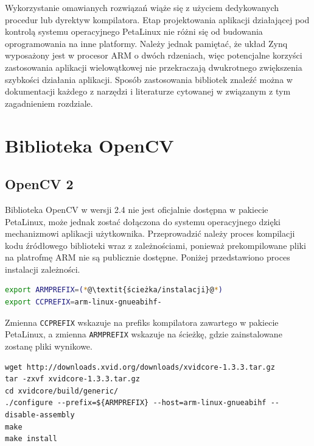 Wykorzystanie omawianych rozwiązań wiąże się z użyciem dedykowanych procedur lub dyrektyw kompilatora. 
Etap projektowania aplikacji działającej pod kontrolą systemu operacyjnego PetaLinux nie różni się od budowania oprogramowania na inne platformy. Należy jednak pamiętać, że układ Zynq wyposażony jest w procesor ARM o dwóch rdzeniach, więc potencjalne korzyści zastosowania aplikacji wielowątkowej nie przekraczają dwukrotnego zwiększenia szybkości działania aplikacji.
Sposób zastosowania bibliotek znaleźć można w dokumentacji każdego z narzędzi i literaturze cytowanej w związanym z tym zagadnieniem rozdziale.

\section{Biblioteka OpenCV}
\label{sec:opencv-config}
\subsection{OpenCV 2}
Biblioteka OpenCV w wersji 2.4 nie jest oficjalnie dostępna w pakiecie PetaLinux, może jednak zostać dołączona do systemu operacyjnego dzięki mechanizmowi aplikacji użytkownika.
Przeprowadzić należy proces kompilacji kodu źródłowego biblioteki wraz z zależnościami, ponieważ prekompilowane pliki na platrofmę ARM nie są publicznie dostępne. Poniżej przedstawiono proces instalacji zależności.%

\begin{lstlisting}[breaklines=true, language=Bash, caption=Definicja zmiennych środowiskowych.]
export ARMPREFIX=(*@\textit{ścieżka/instalacji}@*)
export CCPREFIX=arm-linux-gnueabihf-
\end{lstlisting}

Zmienna \texttt{CCPREFIX} wskazuje na prefiks kompilatora zawartego w pakiecie PetaLinux, a zmienna \texttt{ARMPREFIX} wskazuje na ścieżkę, gdzie zainstalowane zostanę pliki wynikowe.

\begin{lstlisting}[breaklines=true, caption=Kompilacja biblioteki \textit{xVideo}.]
wget http://downloads.xvid.org/downloads/xvidcore-1.3.3.tar.gz
tar -zxvf xvidcore-1.3.3.tar.gz
cd xvidcore/build/generic/
./configure --prefix=${ARMPREFIX} --host=arm-linux-gnueabihf --disable-assembly
make
make install
\end{lstlisting}

